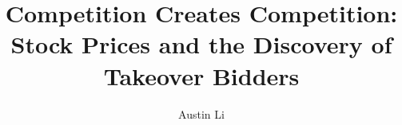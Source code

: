 \documentclass[
  12pt,
]{article}
\title{Competition Creates Competition: Stock Prices and the Discovery
of Takeover Bidders}
\author{Austin Li}
\date{}
\begin{document}
\hypertarget{stub-context}{}

\end{document}
